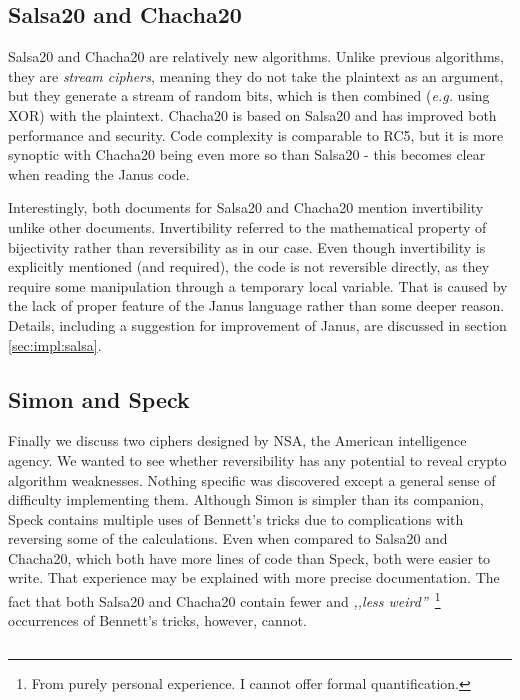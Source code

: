 \documentclass[a4paper,10pt,openright]{memoir}
\newcommand{\eg}{\emph{e.g.}\xspace}
\newcommand{\term}[1]{\textit{#1}}
\begin{document}
\subsection{Salsa20 and Chacha20}

Salsa20 and Chacha20 are relatively new algorithms. Unlike previous 
algorithms, they are \term{stream ciphers}, meaning they do not take 
the plaintext as an argument, but they generate a stream of random 
bits, which is then combined (\eg using XOR) with the plaintext. 
Chacha20 is based on Salsa20 and has improved both performance and 
security. Code complexity is comparable to RC5, but it is more synoptic 
with Chacha20 being even more so than Salsa20 - this becomes clear when 
reading the Janus code.

Interestingly, both documents for Salsa20 and Chacha20 mention 
invertibility unlike other documents. Invertibility referred to the 
mathematical property of bijectivity rather than reversibility as in 
our case. Even though invertibility is explicitly mentioned (and 
required), the code is not reversible directly, as they require some 
manipulation through a temporary local variable. That is caused by the 
lack of proper feature of the Janus language rather than some deeper 
reason. Details, including a suggestion for improvement of Janus, are 
discussed in section \ref{sec:impl:salsa}.

\subsection{Simon and Speck}

Finally we discuss two ciphers designed by NSA, the American 
intelligence agency. We wanted to see whether reversibility has any 
potential to reveal crypto algorithm weaknesses. Nothing specific was 
discovered except a general sense of difficulty implementing them. 
Although Simon is simpler than its companion, Speck contains multiple 
uses of Bennett's tricks due to complications with reversing some of 
the calculations. Even when compared to Salsa20 and Chacha20, which 
both have more lines of code than Speck, both were easier to write. 
That experience may be explained with more precise documentation. The 
fact that both Salsa20 and Chacha20 contain fewer and \textit{,,less 
weird''}~\footnote{From purely personal experience. I cannot offer 
formal quantification.} occurrences of Bennett's tricks, however, 
cannot.

\begin{lstlisting}
\end{lstlisting}
\end{document}
